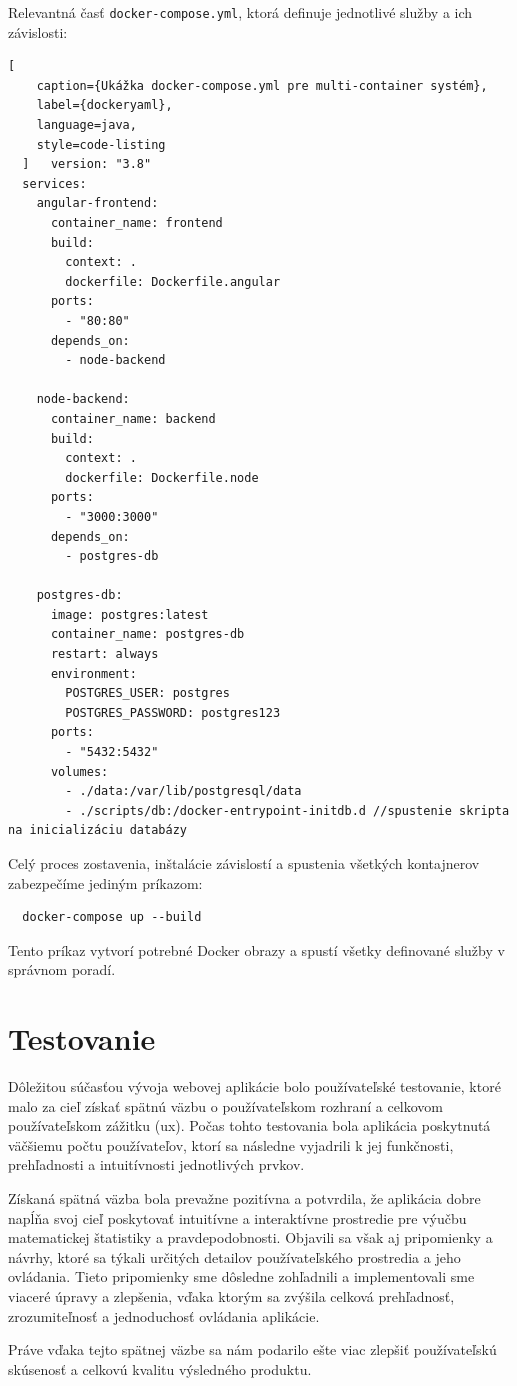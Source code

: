   Relevantná časť \texttt{docker-compose.yml}, ktorá definuje jednotlivé služby a ich závislosti:
  
  \begin{lstlisting}[
    caption={Ukážka docker-compose.yml pre multi-container systém},
    label={dockeryaml},
    language=java,
    style=code-listing
  ]   version: "3.8"
  services:
    angular-frontend:
      container_name: frontend
      build:
        context: .
        dockerfile: Dockerfile.angular
      ports:
        - "80:80"
      depends_on:
        - node-backend
  
    node-backend:
      container_name: backend
      build:
        context: .
        dockerfile: Dockerfile.node
      ports:
        - "3000:3000"
      depends_on:
        - postgres-db
  
    postgres-db:
      image: postgres:latest
      container_name: postgres-db
      restart: always
      environment:
        POSTGRES_USER: postgres
        POSTGRES_PASSWORD: postgres123
      ports:
        - "5432:5432"
      volumes:
        - ./data:/var/lib/postgresql/data
        - ./scripts/db:/docker-entrypoint-initdb.d //spustenie skripta na inicializáciu databázy
  \end{lstlisting}
  
  Celý proces zostavenia, inštalácie závislostí a spustenia všetkých kontajnerov zabezpečíme jediným príkazom:
  
  \begin{verbatim}
  docker-compose up --build
  \end{verbatim}
  
  Tento príkaz vytvorí potrebné Docker obrazy a spustí všetky definované služby v správnom poradí.
  


  \section{Testovanie}
  Dôležitou súčasťou vývoja webovej aplikácie bolo používateľské testovanie, ktoré malo za cieľ získať spätnú väzbu o používateľskom rozhraní a celkovom používateľskom zážitku (\acrshort{ux}). 
  Počas tohto testovania bola aplikácia poskytnutá väčšiemu počtu používateľov, ktorí sa následne vyjadrili k jej funkčnosti, prehľadnosti a intuitívnosti jednotlivých prvkov.

Získaná spätná väzba bola prevažne pozitívna a potvrdila, že aplikácia dobre napĺňa svoj cieľ poskytovať intuitívne a interaktívne prostredie pre výučbu matematickej štatistiky a pravdepodobnosti. 
Objavili sa však aj pripomienky a návrhy, ktoré sa týkali určitých detailov používateľského prostredia a jeho ovládania. 
Tieto pripomienky sme dôsledne zohľadnili a implementovali sme viaceré úpravy a zlepšenia, vďaka ktorým sa zvýšila celková prehľadnosť, zrozumiteľnosť a jednoduchosť ovládania aplikácie.

Práve vďaka tejto spätnej väzbe sa nám podarilo ešte viac zlepšiť používateľskú skúsenosť a celkovú kvalitu výsledného produktu.